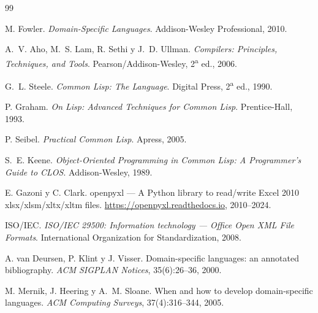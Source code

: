 \documentclass[12pt,a4paper]{report}
\theoremstyle{defstyle}
\begin{document}










\begin{thebibliography}{99}

M. Fowler.
\newblock \textit{Domain-Specific Languages}.
\newblock Addison-Wesley Professional, 2010.

A.~V. Aho, M.~S. Lam, R. Sethi y J.~D. Ullman.
\newblock \textit{Compilers: Principles, Techniques, and Tools}.
\newblock Pearson/Addison-Wesley, 2\textsuperscript{a} ed., 2006.

G.~L. Steele.
\newblock \textit{Common Lisp: The Language}.
\newblock Digital Press, 2\textsuperscript{a} ed., 1990.

P. Graham.
\newblock \textit{On Lisp: Advanced Techniques for Common Lisp}.
\newblock Prentice-Hall, 1993.

P. Seibel.
\newblock \textit{Practical Common Lisp}.
\newblock Apress, 2005.

S.~E. Keene.
\newblock \textit{Object-Oriented Programming in Common Lisp: A Programmer's
  Guide to CLOS}.
\newblock Addison-Wesley, 1989.

E. Gazoni y C. Clark.
\newblock openpyxl --- A Python library to read/write Excel 2010 xlsx/xlsm/xltx/xltm files.
\newblock \url{https://openpyxl.readthedocs.io}, 2010--2024.

{ISO/IEC}.
\newblock \textit{ISO/IEC 29500: Information technology --- Office Open XML File Formats}.
\newblock International Organization for Standardization, 2008.

A. van Deursen, P. Klint y J. Visser.
\newblock Domain-specific languages: an annotated bibliography.
\newblock \textit{ACM SIGPLAN Notices}, 35(6):26--36, 2000.

M. Mernik, J. Heering y A.~M. Sloane.
\newblock When and how to develop domain-specific languages.
\newblock \textit{ACM Computing Surveys}, 37(4):316--344, 2005.


\end{thebibliography}
\end{document}
